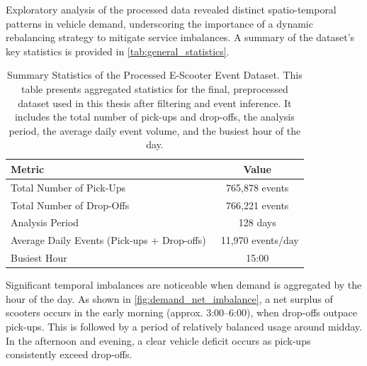 Exploratory analysis of the processed data revealed distinct spatio-temporal patterns in vehicle demand, underscoring the importance of a dynamic rebalancing strategy to mitigate service imbalances.
A summary of the dataset's key statistics is provided in \autoref{tab:general_statistics}.

\begin{table}[!htb]
    \centering
    \begin{tabularx}{.8\textwidth}{Xc}
        \toprule
        \textbf{Metric} & \textbf{Value} \\ 
        \midrule
        Total Number of Pick-Ups                        & 765,878 events \\
        Total Number of Drop-Offs                       & 766,221 events \\
        Analysis Period                                 & 128 days\\
        Average Daily Events (Pick-ups + Drop-offs)     & ~11,970 events/day \\
        Busiest Hour                                    & 15:00 \\
        \bottomrule
    \end{tabularx}
    \caption{Summary Statistics of the Processed E-Scooter Event Dataset. This table presents aggregated statistics for the final, preprocessed dataset used in this thesis after filtering and event inference. It includes the total number of pick-ups and drop-offs, the analysis period, the average daily event volume, and the busiest hour of the day.}
    \label{tab:general_statistics}
\end{table}


Significant temporal imbalances are noticeable when demand is aggregated by the hour of the day.
As shown in \autoref{fig:demand_net_imbalance}, a net surplus of scooters occurs in the early morning (approx. 3:00–6:00), when drop-offs outpace pick-ups.
This is followed by a period of relatively balanced usage around midday.
In the afternoon and evening, a clear vehicle deficit occurs as pick-ups consistently exceed drop-offs.

